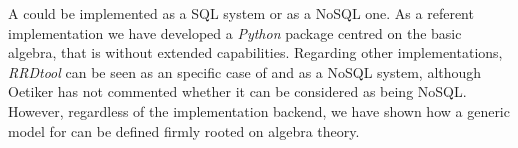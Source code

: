 


A  could be implemented as a SQL  system or as
a NoSQL one. As a referent implementation we have developed a
\emph{Python} package centred on the basic algebra, that is without
extended  capabilities. Regarding other implementations,
\emph{RRDtool} can be seen as an specific case of  and as
a NoSQL system, although Oetiker \cite{rrdtool} has not commented
whether it can be considered as being NoSQL. However, regardless of
the implementation backend, we have shown how a generic model for
 can be defined firmly rooted on  algebra
theory. 













